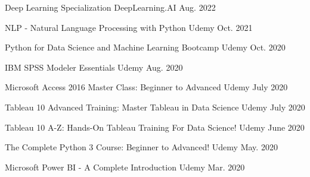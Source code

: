 
\begin{cvhonors}

  \cvhonor
    {Deep Learning Specialization} %
    {DeepLearning.AI} %
    {} %
    {Aug. 2022} %
    
  \cvhonor
    {NLP - Natural Language Processing with Python} %
    {Udemy} %
    {} %
    {Oct. 2021} %
    
  \cvhonor
    {Python for Data Science and Machine Learning Bootcamp} %
    {Udemy} %
    {} %
    {Oct. 2020} %
    
  \cvhonor
    {IBM SPSS Modeler Essentials} %
    {Udemy} %
    {} %
    {Aug. 2020} %
        
  \cvhonor
    {Microsoft Access 2016 Master Class: Beginner to Advanced}
    {Udemy} %
    {} %
    {July 2020} %

  \cvhonor
    {Tableau 10 Advanced Training: Master Tableau in Data Science}
    {Udemy} %
    {} %
    {July 2020} %

  \cvhonor
    {Tableau 10 A-Z: Hands-On Tableau Training For Data Science!} %
    {Udemy} %
    {} %
    {June 2020} %

  \cvhonor
    {The Complete Python 3 Course: Beginner to Advanced!} %
    {Udemy} %
    {} %
    {May. 2020} %

  \cvhonor
    {Microsoft Power BI - A Complete Introduction} %
    {Udemy} %
    {} %
    {Mar. 2020} %
    
\end{cvhonors}

